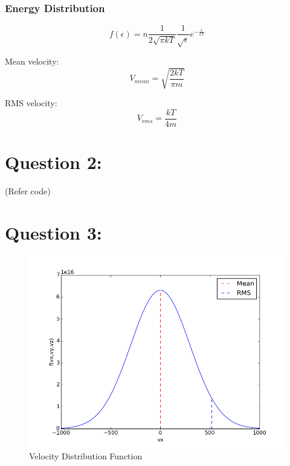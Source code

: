 \documentclass[11pt, a4paper]{article}
\begin{document}
\subsubsection{Energy Distribution}
\begin{equation}
 f(\epsilon) = n\frac{1}{2\sqrt{\pi k T}}\frac{1}{\sqrt{\epsilon}}e^{-\frac{\epsilon}{kT}}
\end{equation}

Mean velocity:
\begin{equation}
 V_{mean} = \sqrt{\frac{2kT}{\pi m}}
\end{equation}

RMS velocity:
\begin{equation}
 V_{rms} = \frac{kT}{4m}
\end{equation}

\section{Question 2:}
(Refer code)
\section{Question 3:}
\begin{figure}[H]
 \centering
 \includegraphics[width = \textwidth]{Q3vel.png}
 \caption{Velocity Distribution Function}
 \label{fig:vel_pdf}
\end{figure}
\end{document}
